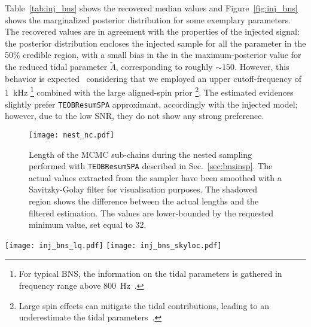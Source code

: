 \documentclass[prd,aps,twocolumn,a4paper,showkeys,nofootinbib,floatfix]{revtex4-1}
\def\tLam{{\tilde\Lambda}}
\begin{document}
Table~\ref{tab:inj_bns} shows the recovered median values 
and Figure~\ref{fig:inj_bns} shows the marginalized posterior distribution
for some exemplary parameters. 
The recovered values are in agreement with the properties of the
injected signal: the posterior distribution encloses the injected sample
for all the parameter in the 50\% credible region, with a
small bias in the in the maximum-posterior value  
for the reduced tidal parameter $\tLam$, corresponding to
roughly ${\sim}150$. However,
this behavior is expected~\cite{Wade:2014vqa,Abbott:2018wiz,Dudi:2018jzn,Samajdar:2019ulq,Gamba:2020wgg}
considering that we employed an upper cutoff-frequency of 1~kHz
\footnote{For typical BNS, the information on the tidal parameters 
	is gathered in frequency range above 800~Hz~\cite{Damour:2012yf,Gamba:2020wgg}.}
combined with the large aligned-spin prior
\footnote{Large spin effects can mitigate the tidal contributions,
	leading to an underestimate the tidal parameters~\cite{Samajdar:2019ulq}.}.
The estimated evidences slightly prefer {\tt TEOBResumSPA} approximant,
accordingly with the injected model; however, due to the low SNR,
they do not show any strong preference.

\begin{figure}[t]
	\centering 
	\texttt{[image: nest\_nc.pdf]}
	\caption{Length of the MCMC sub-chains during the nested sampling 
		performed with {\tt TEOBResumSPA} described in Sec.~\ref{sec:bnsinsp}.
		The actual values extracted from the sampler 
		have been smoothed with a Savitzky-Golay filter for visualisation purposes.
		The shadowed region shows the difference between the actual lengths
		and the filtered estimation.
		The values are lower-bounded by the requested minimum value, set equal to 32.}
	\label{fig:inj_bns_chain}
\end{figure}


\begin{figure*}[t]
	\centering 
	\texttt{[image: inj\_bns\_lq.pdf]}
	\texttt{[image: inj\_bns\_skyloc.pdf]}
	\caption{Posterior distributions for $\{q,\tLam\}$ and 
		$\{\alpha, \delta\}$ recovered from the injection studies 
		performed on an inspiralling BNS signal with two inteferometers ({\tt H1}+{\tt L1}) at design sensitivities with network SNR of 20.
		The artificial signal has been generated with {\tt TEOBResumS} model and the injected parameters 
		are marked with black lines and squares.
		The recovery has been performed with three different approximants analysing frequency range from 20~Hz to 1~kHz. 
		The degeneracy in the sky location can be removed introducing a third detector~\cite{Abbott:2017oio} 
		and it is due to the correlations 
		between longitudinal and latitudinal angles 
		that concur in the estimation of times of arrival in the different interferometers.}
	\label{fig:inj_bns}
\end{figure*}
\end{document}
